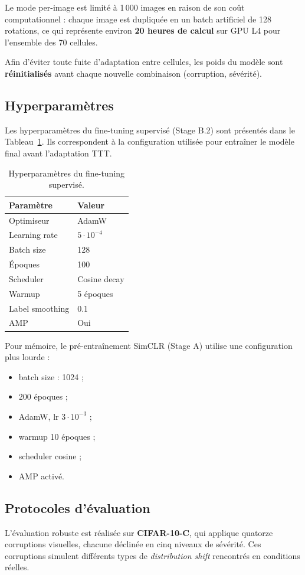 \documentclass[12pt,a4paper]{report}
\begin{document}
	Le mode per-image est limité à 1\,000 images en raison de son coût computationnel :  
	chaque image est dupliquée en un batch artificiel de 128 rotations, ce qui représente environ \textbf{20 heures de calcul} sur GPU L4 pour l’ensemble des 70 cellules.
	
	Afin d’éviter toute fuite d’adaptation entre cellules, les poids du modèle sont \textbf{réinitialisés} avant chaque nouvelle combinaison (corruption, sévérité).

	\subsection{Hyperparamètres}
	Les hyperparamètres du fine-tuning supervisé (Stage B.2) sont présentés dans le Tableau~\ref{tab:train_params_ft}.  
	Ils correspondent à la configuration utilisée pour entraîner le modèle final avant l’adaptation TTT.
	\begin{table}[H]
		\centering
		\begin{tabular}{p{5cm} p{4cm}}
			\toprule
			\textbf{Paramètre} & \textbf{Valeur} \\
			\midrule
			Optimiseur & AdamW \\
			Learning rate & $5 \cdot 10^{-4}$ \\
			Batch size & 128 \\
			Époques & 100 \\
			Scheduler & Cosine decay \\
			Warmup & 5 époques \\
			Label smoothing & 0.1 \\
			AMP & Oui \\
			\bottomrule
		\end{tabular}
		\caption{Hyperparamètres du fine-tuning supervisé.}
		\label{tab:train_params_ft}
	\end{table}
	
	
	Pour mémoire, le pré-entraînement SimCLR (Stage A) utilise une configuration plus lourde :
	\begin{itemize}
		\item batch size : 1024 ;
		\item 200 époques ;
		\item AdamW, lr $3\cdot10^{-3}$ ;
		\item warmup 10 époques ;
		\item scheduler cosine ;
		\item AMP activé.
	\end{itemize}
	
	\subsection{Protocoles d’évaluation}
	L’évaluation robuste est réalisée sur \textbf{CIFAR-10-C}, qui applique quatorze corruptions visuelles, chacune déclinée en cinq niveaux de sévérité.  
	Ces corruptions simulent différents types de \textit{distribution shift} rencontrés en conditions réelles.
	
\end{document}
